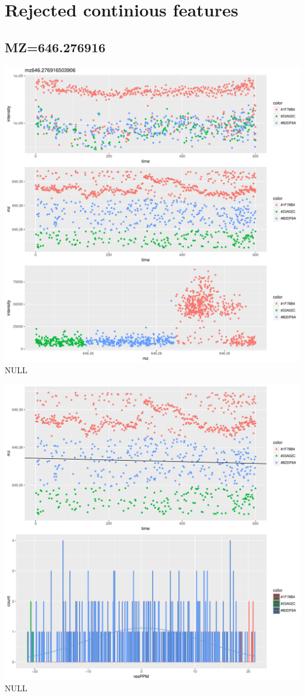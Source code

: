 \documentclass[]{article}
\begin{document}
\section{Rejected continious
features}\label{rejected-continious-features}

\subsection{MZ=646.276916}\label{mz646.276916}

\includegraphics{Supplementary_document_files/figure-latex/cluster.mz.646-1.pdf}
NULL

\includegraphics{Supplementary_document_files/figure-latex/filter.lm.646-1.pdf}
NULL
\end{document}
